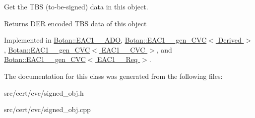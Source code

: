 Get the T\-B\-S (to-\/be-\/signed) data in this object. \begin{DoxyReturn}{Returns}
D\-E\-R encoded T\-B\-S data of this object 
\end{DoxyReturn}


Implemented in \hyperlink{classBotan_1_1EAC1__1__ADO_a04ba7c24bf6e7385fc73fe0d48496a2f}{Botan\-::\-E\-A\-C1\-\_\-\_\-\-A\-D\-O}, \hyperlink{classBotan_1_1EAC1__1__gen__CVC_af41f854bcf3ab05584e2d4f0c01ee5f0}{Botan\-::\-E\-A\-C1\-\_\-\_\-gen\-\_\-\-C\-V\-C$<$ Derived $>$}, \hyperlink{classBotan_1_1EAC1__1__gen__CVC_af41f854bcf3ab05584e2d4f0c01ee5f0}{Botan\-::\-E\-A\-C1\-\_\-\_\-gen\-\_\-\-C\-V\-C$<$ E\-A\-C1\-\_\-\_\-\-C\-V\-C $>$}, and \hyperlink{classBotan_1_1EAC1__1__gen__CVC_af41f854bcf3ab05584e2d4f0c01ee5f0}{Botan\-::\-E\-A\-C1\-\_\-\_\-gen\-\_\-\-C\-V\-C$<$ E\-A\-C1\-\_\-\_\-\-Req $>$}.



The documentation for this class was generated from the following files\-:\begin{DoxyCompactItemize}
\item 
src/cert/cvc/signed\-\_\-obj.\-h\item 
src/cert/cvc/signed\-\_\-obj.\-cpp\end{DoxyCompactItemize}
